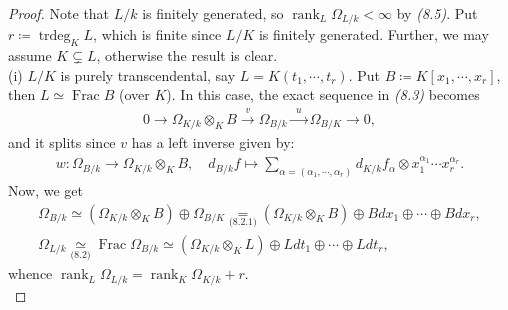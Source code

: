 \documentclass[11pt,a4paper,footinclude=true,headinclude=true]{scrbook} %
\DeclareMathOperator{\Frac}{Frac}
\DeclareMathOperator{\trdeg}{trdeg}
\DeclareMathOperator{\rank}{rank}
\newcommand{\<}{\langle}
\newcommand{\>}{\rangle}
\begin{document}
\begin{proof}
    Note that $L/k$ is finitely generated, so $\rank_L\Omega_{L/k}<\infty$ by \textit{(8.5)}. Put $r\coloneqq\trdeg_KL$, which is finite since $L/K$ is finitely generated. Further, we may assume $K\subsetneq L$, otherwise the result is clear.\\
    
    (i) $L/K$ is purely transcendental, say $L=K(t_1,\cdots,t_r)$. Put $B\coloneqq K[x_1,\cdots,x_r]$, then $L\simeq\Frac B$ (over $K$). In this case, the exact sequence in \textit{(8.3)} becomes
    \begin{align*}
        0\longrightarrow\Omega_{K/k}\otimes_KB\xrightarrow{~~v~~}\Omega_{B/k}\xrightarrow{~~u~~}\Omega_{B/K}\longrightarrow0,
    \end{align*}
    and it splits since $v$ has a left inverse given by:
    \begin{align*}
        w:\Omega_{B/k}\longrightarrow\Omega_{K/k}\otimes_KB,\quad d_{B/k}f\longmapsto\sum_{\alpha=(\alpha_1,\cdots,\alpha_r)}d_{K/k}f_\alpha\otimes x_1^{\alpha_1}\cdots x_r^{\alpha_r}.
    \end{align*}
    Now, we get
    \begin{align*}
        \Omega_{B/k}\simeq(\Omega_{K/k}\otimes_KB)\oplus\Omega_{B/K}\underset{\textit{(8.2.1)}}{=}(\Omega_{K/k}\otimes_KB)\oplus Bdx_1\oplus\cdots\oplus Bdx_r,\\
        \Omega_{L/k}\underset{\textit{(8.2)}}{\simeq}\Frac\Omega_{B/k}\simeq(\Omega_{K/k}\otimes_KL)\oplus Ldt_1\oplus\cdots\oplus Ldt_r,
    \end{align*}
    whence $\rank_L\Omega_{L/k}=\rank_K\Omega_{K/k}+r$.\\
    

\end{proof}
\end{document}
